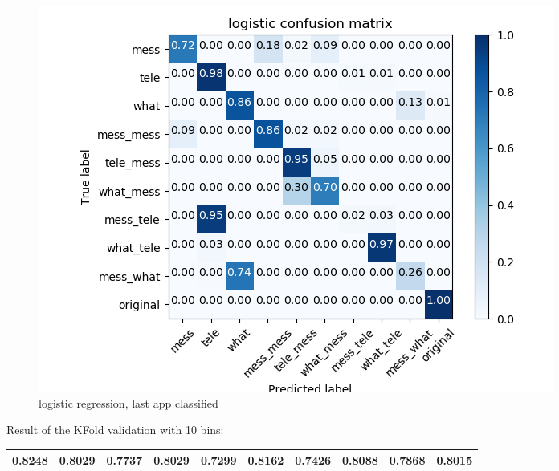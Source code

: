  \begin{figure}[H] 
\centering 
\includegraphics[scale=.6]{images/lr_initial_single_double_complete.png} 
\caption{logistic regression, last app classified} 
\end{figure} 


Result of the KFold validation with 10 bins:
 {\def\arraystretch{1.3} 
 \begin{table}[H] 
\centering 
\begin{tabular}{|l |l |l |l |l |l |l |l |l |l |}  
\hline 
0.8248&
0.8029&
0.7737&
0.8029&
0.7299&
0.8162&
0.7426&
0.8088&
0.7868&
0.8015\\ \hline  

\end{tabular} 
\end{table} }

